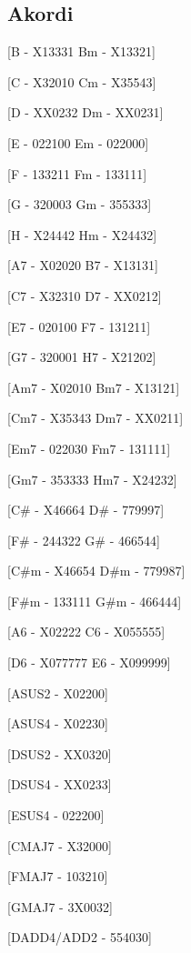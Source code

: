 \documentclass[a4paper,12pt]{article}
\begin{document}
\setlength{\columnseprule}{0.5pt}
\begin{multicols}{2}
\section{Akordi}
\begin{guitar}
[A - X02220  Am - X02210]

[B - X13331  Bm - X13321]

[C - X32010  Cm - X35543]  

[D - XX0232  Dm - XX0231] 

[E - 022100  Em - 022000] 

[F - 133211  Fm - 133111]

[G - 320003  Gm - 355333]

[H - X24442  Hm - X24432]


[A7 - X02020  B7 - X13131]

[C7 - X32310  D7 - XX0212]

[E7 - 020100  F7 - 131211]

[G7 - 320001  H7 - X21202]


[Am7 - X02010  Bm7 - X13121]

[Cm7 - X35343  Dm7 - XX0211]

[Em7 - 022030  Fm7 - 131111]

[Gm7 - 353333  Hm7 - X24232]


[C# - X46664  D# - 779997]

[F# - 244322  G# - 466544]


[C#m - X46654  D#m - 779987]

[F#m - 133111  G#m - 466444]


[A6 - X02222  C6 - X055555]

[D6 - X077777 E6 - X099999]


[ASUS2 - X02200]

[ASUS4 - X02230]

[DSUS2 - XX0320] 

[DSUS4 - XX0233]

[ESUS4 - 022200]

[CMAJ7 - X32000]

[FMAJ7 - 103210]

[GMAJ7 - 3X0032]

[DADD4/ADD2 - 554030]

\end{guitar}

\end{multicols}
\end{document}
